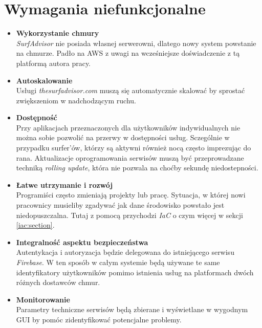 \section{Wymagania niefunkcjonalne}

\begin{itemize}
    \item
    \textbf{Wykorzystanie chmury}\\
    \emph{SurfAdvisor} nie posiada własnej serwerowni, dlatego nowy system powstanie na chmurze.
    Padło na AWS z uwagi na wcześniejsze doświadczenie z tą platformą autora pracy.

    \item
    \textbf{Autoskalowanie}\\
    Usługi \emph{thesurfadvisor.com} muszą się automatycznie skalować by sprostać zwiększeniom w nadchodzącym ruchu.

    \item
    \textbf{Dostępność}\\
    Przy aplikacjach przeznaczonych dla użytkowników indywidualnych nie można sobie pozwolić na przerwy w dostępności usług.
    Sczególnie w przypadku surfer'ów, którzy są aktywni również nocą często imprezując do rana.
    Aktualizacje oprogramowania serwisów muszą być przeprowadzane techniką \emph{rolling update}, która nie pozwala na choćby sekundę niedostepności.

    \item
    \textbf{Łatwe utrzymanie i rozwój}\\
    Programiści często zmieniają projekty lub pracę. Sytuacja, w której nowi pracownicy musieliby zgadywać jak dane środowisko powstało jest niedopuszczalna.
    Tutaj z pomocą przychodzi \emph{IaC} o czym więcej w sekcji \ref{iac:section}.

    \item
    \textbf{Integralność aspektu bezpieczeństwa}\\
    Autentykacja i autoryzacja będzie delegowana do istniejącego serwisu \emph{Firebase}. 
    W ten sposób w całym systemie będą używane te same identyfikatory użytkowników pomimo istnienia usług na platformach dwóch różnych dostawców chmur.

    \item
    \textbf{Monitorowanie}\\
    Parametry techniczne serwisów będą zbierane i wyświetlane w wygodnym GUI by pomóc zidentyfikować potencjalne problemy.

\end{itemize} 


